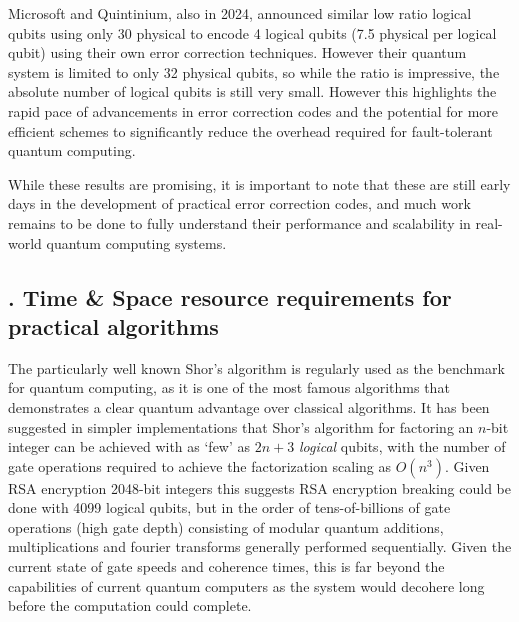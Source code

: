 \documentclass{elbioimp2}
\begin{document}
Microsoft and Quintinium, also in 2024, announced similar low ratio logical qubits using only 30 physical to encode 4 logical qubits (7.5 physical per logical qubit) using their own error correction techniques. However their quantum system is limited to only 32 physical qubits, so while the ratio is impressive, the absolute number of logical qubits is still very small\cite{paetznick2024demonstrationlogicalqubitsrepeated}. However this highlights the rapid pace of advancements in error correction codes and the potential for more efficient schemes to significantly reduce the overhead required for fault-tolerant quantum computing.

While these results are promising, it is important to note that these are still early days in the development of practical error correction codes, and much work remains to be done to fully understand their performance and scalability in real-world quantum computing systems.

\subsection{. Time \& Space resource requirements for practical algorithms}
The particularly well known Shor’s algorithm is regularly used as the benchmark for quantum computing, as it is one of the most famous algorithms that demonstrates a clear quantum advantage over classical algorithms. It has been suggested in simpler implementations that Shor's algorithm for factoring an $n$-bit integer can be achieved with as `few' as $2n+3$ \textit{logical} qubits, with the number of gate operations required to achieve the factorization scaling as $O(n^3)$\cite{beauregard2003circuitshorsalgorithmusing}. Given RSA encryption 2048-bit integers this suggests RSA encryption breaking could be done with 4099 logical qubits, but in the order of tens-of-billions of gate operations (high gate depth) consisting of modular quantum additions, multiplications and fourier transforms generally performed sequentially. Given the current state of gate speeds and coherence times, this is far beyond the capabilities of current quantum computers as the system would decohere long before the computation could complete.
\end{document}

